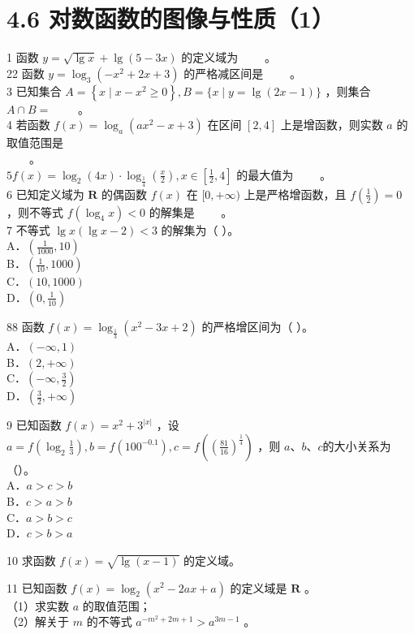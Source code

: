 \documentclass[10pt]{article}
\begin{document}
\section*{4.6 对数函数的图像与性质（1）}
1 函数 \(y=\sqrt{\lg x}+\lg (5-3 x)\) 的定义域为 \(\qquad\)。\\
22 函数 \(y=\log _{3}\left(-x^{2}+2 x+3\right)\) 的严格减区间是 \(\qquad\)。\\
3 已知集合 \(A=\left\{x \mid x-x^{2} \geqslant 0\right\}, B=\{x \mid y=\lg (2 x-1)\}\) ，则集合 \(A \cap B=\) \(\qquad\)。\\
4 若函数 \(f(x)=\log _{a}\left(a x^{2}-x+3\right)\) 在区间 \([2,4]\) 上是增函数，则实数 \(a\) 的取值范围是\\
\(\qquad\)。\\
\(5 f(x)=\log _{2}(4 x) \cdot \log _{\frac{1}{4}}\left(\frac{x}{2}\right), x \in\left[\frac{1}{2}, 4\right]\) 的最大值为 \(\qquad\)。\\
6 已知定义域为 \(\mathbf{R}\) 的偶函数 \(f(x)\) 在 \([0,+\infty)\) 上是严格增函数，且 \(f\left(\frac{1}{2}\right)=0\) ，则不等式 \(f\left(\log _{4} x\right)<0\) 的解集是 \(\qquad\)。\\
7 不等式 \(\lg x(\lg x-2)<3\) 的解集为（ ）。\\
A．\(\left(\frac{1}{1000}, 10\right)\)\\
B．\(\left(\frac{1}{10}, 1000\right)\)\\
C．\((10,1000)\)\\
D．\(\left(0, \frac{1}{10}\right)\)

88 函数 \(f(x)=\log _{\frac{1}{3}}\left(x^{2}-3 x+2\right)\) 的严格增区间为（ ）。\\
A．\((-\infty, 1)\)\\
B．\((2,+\infty)\)\\
C．\(\left(-\infty, \frac{3}{2}\right)\)\\
D．\(\left(\frac{3}{2},+\infty\right)\)

9 已知函数 \(f(x)=x^{2}+3^{|x|}\) ，设 \(a=f\left(\log _{2} \frac{1}{3}\right), b=f\left(100^{-0.1}\right), c=f\left(\left(\frac{81}{16}\right)^{\frac{1}{4}}\right)\) ，则 \(a 、 b 、 c\)的大小关系为（）。\\
A．\(a>c>b\)\\
B．\(c>a>b\)\\
C．\(a>b>c\)\\
D．\(c>b>a\)

10 求函数 \(f(x)=\sqrt{\lg (x-1)}\) 的定义域。

11 已知函数 \(f(x)=\log _{2}\left(x^{2}-2 a x+a\right)\) 的定义域是 \(\mathbf{R}\) 。\\
（1）求实数 \(a\) 的取值范围；\\
（2）解关于 \(m\) 的不等式 \(a^{-m^{2}+2 m+1}>a^{3 m-1}\) 。
\end{document}
